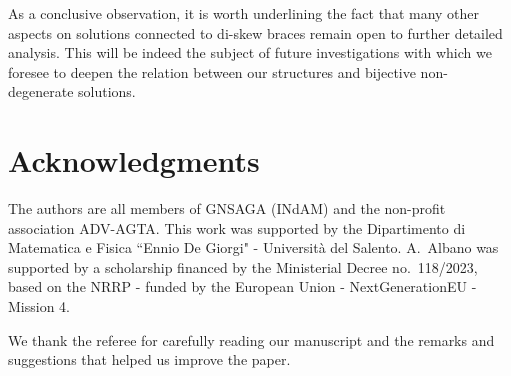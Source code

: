 \documentclass[preprint,1p]{elsarticle}
\numberwithin{equation}{section}
\theoremstyle{definition}               %
\begin{document}
As a conclusive observation, it is worth underlining the fact that many other aspects on solutions connected to di-skew braces remain open to further detailed analysis.
This will be indeed the subject of future investigations with which we foresee to deepen the relation between our structures and bijective non-degenerate solutions.

\smallskip

\section*{Acknowledgments}
The authors are all members of GNSAGA (INdAM) and the non-profit association ADV-AGTA. This work was supported by the Dipartimento di Matematica e Fisica ``Ennio De Giorgi" - Università del Salento.
A.~Albano was supported by a scholarship financed by the Ministerial Decree no.~118/2023, based on the NRRP - funded by the European Union - NextGenerationEU - Mission 4.

We thank the referee for carefully reading our manuscript and the remarks and suggestions that helped us improve the paper. 

\smallskip

  


 
\end{document}
